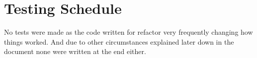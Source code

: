 
\section{Testing Schedule}

No tests were made as the code written for refactor very frequently
changing how things worked. And due to other circumstances explained
later down in the document none were written at the end either.